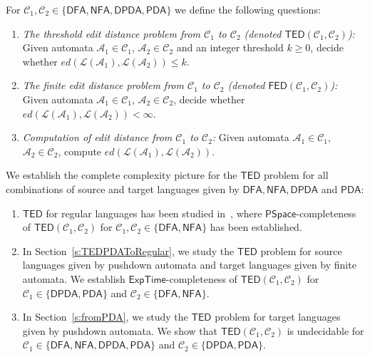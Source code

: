 \documentclass{CSML}
\newcommand{\aut}{\mathcal{A}}
\newcommand{\PSPACE}{\textsf{PSpace}}
\newcommand{\EXPTIME}{\textsf{ExpTime}}
\newcommand{\class}{\mathcal{C}}
\newcommand{\DFA}{\mathsf{DFA}}
\newcommand{\NFA}{\mathsf{NFA}}
\newcommand{\PDA}{\mathsf{PDA}}
\newcommand{\DPDA}{\mathsf{DPDA}}
\newcommand{\TED}{\mathsf{TED}}
\newcommand{\FED}{\mathsf{FED}}
\newcommand{\lang}{\mathcal{L}}
\newcommand{\ed}{ed}
\begin{document}
\begin{defi}
For  $\class_1, \class_2 \in \{ \DFA, \NFA, \DPDA, \PDA \}$ we define the following questions:
\begin{enumerate}
\item \emph{The threshold edit distance problem from $\class_1$ to $\class_2$ (denoted $\TED(\class_1,\class_2)$):} 
Given automata $\aut_1 \in \class_1$, $\aut_2 \in \class_2$ and an integer threshold $k\geq 0$, 
decide whether $\ed(\lang(\aut_1), \lang(\aut_2)) \leq k$.

\item
 \emph{The finite edit distance problem from $\class_1$ to $\class_2$ (denoted $\FED(\class_1,\class_2)$):}
Given automata  $\aut_1 \in \class_1$, $\aut_2 \in \class_2$,
decide whether $\ed(\lang(\aut_1), \lang(\aut_2)) < \infty$.


\item \emph{Computation of edit distance from $\class_1$ to $\class_2$:}
Given automata  $\aut_1 \in \class_1$, $\aut_2 \in \class_2$,
compute $\ed(\lang(\aut_1), \lang(\aut_2))$.
\end{enumerate}
\end{defi}


\noindent We establish the complete complexity picture for the $\TED$ problem for all combinations of 
source and target languages given by $\DFA, \NFA, \DPDA$ and $\PDA$:
\begin{enumerate}
\item $\TED$ for regular languages has been studied in~\cite{riveros}, where 
 $\PSPACE$-completeness of $\TED(\class_1, \class_2)$ for  $\class_1, \class_2 \in \{\DFA, \NFA\}$
has been established.
\item In Section~\ref{s:TEDPDAToRegular}, we study  the $\TED$ problem 
for source languages given by pushdown automata and target languages given 
by finite automata. 
We establish $\EXPTIME$-completeness of $\TED(\class_1, \class_2)$ for
 $\class_1 \in \{\DPDA, \PDA\}$ and $\class_2 \in \{\DFA, \NFA\}$.
\item In Section~\ref{s:fromPDA}, we study the $\TED$ problem for target languages
given by pushdown automata. We show that $\TED(\class_1, \class_2)$ is undecidable for 
$\class_1 \in \{\DFA, \NFA,\DPDA, \PDA\}$ and $\class_2 \in \{\DPDA, \PDA\}$.
\end{enumerate}
\end{document}
